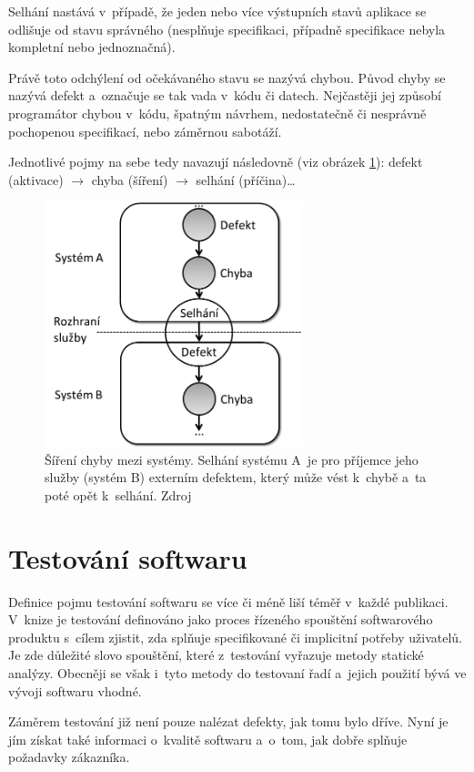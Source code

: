 	Selhání nastává v~případě, že jeden nebo více výstupních stavů aplikace se odlišuje od stavu správného (nesplňuje specifikaci, případně specifikace nebyla kompletní nebo jednoznačná).
	
	Právě toto odchýlení od očekávaného stavu se nazývá chybou. Původ chyby se nazývá defekt a~označuje se tak vada v~kódu či datech. Nejčastěji jej způsobí programátor chybou v~kódu, špatným návrhem, nedostatečně či nesprávně pochopenou specifikací, nebo záměrnou sabotáží.
	
	Jednotlivé pojmy na sebe tedy navazují následovně (viz obrázek \ref{Bug}): defekt (aktivace) $\to$ chyba (šíření) $\to$ selhání (příčina)\dots
	\begin{figure}[ht!]
		\centering
		\caption{Šíření chyby mezi systémy. Selhání systému A~je pro příjemce jeho služby (systém B) externím defektem, který může vést k~chybě a~ta poté opět  k~selhání. Zdroj \citep{RizeniKvalitySW}}
		\label{Bug}
		\includegraphics[width=7.5cm]{img/Bug.png}
	\end{figure}
	
	\section{Testování softwaru}
	Definice pojmu testování softwaru se více či méně liší téměř v~každé publikaci. V~knize \citep{RizeniKvalitySW} je testování definováno jako proces řízeného spouštění softwarového produktu s~cílem zjistit, zda splňuje specifikované či implicitní potřeby uživatelů. Je zde důležité slovo spouštění, které z~testování vyřazuje metody statické analýzy. Obecněji se však i~tyto metody do testovaní řadí a~jejich použití bývá ve vývoji softwaru vhodné.
	
	Záměrem testování již není pouze nalézat defekty, jak tomu bylo dříve. Nyní je jím získat také informaci o~kvalitě softwaru a~o~tom, jak dobře splňuje požadavky zákazníka.
	
